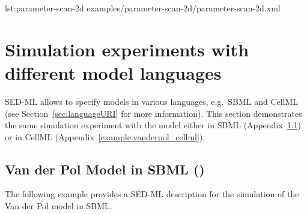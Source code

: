 {lst:parameter-scan-2d}
{examples/parameter-scan-2d/parameter-scan-2d.xml}

\pagebreak
\section{Simulation experiments with different model languages}
SED-ML allows to specify models in various languages, e.g.\ SBML and CellML (see Section~\ref{sec:languageURI} for more information). This section demonstrates the same simulation experiment with the model either in SBML (Appendix~\ref{example:vanderpol_sbml}) or in CellML (Appendix~\ref{example:vanderpol_cellml}).

\subsection{Van der Pol Model in SBML ()}
\label{example:vanderpol_sbml}
The following example provides a SED-ML description for the simulation of the Van der Pol model in SBML.

